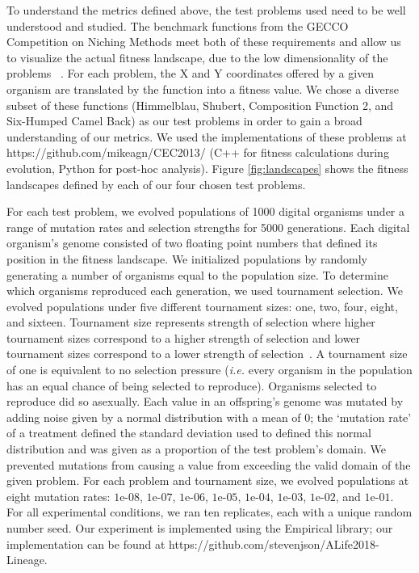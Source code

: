 \documentclass[letterpaper]{article}
\begin{document}
To understand the metrics defined above, the test problems used need to be well understood and studied. The benchmark functions from the GECCO Competition on Niching Methods meet both of these requirements and allow us to visualize the actual fitness landscape, due to the low dimensionality of the problems ~\citep{li_benchmark_2013}. For each problem, the X and Y coordinates offered by a given organism are translated by the function into a fitness value. We chose a diverse subset of these functions (Himmelblau, Shubert, Composition Function 2, and Six-Humped Camel Back) as our test problems in order to gain a broad understanding of our metrics. We used the implementations of these problems at https://github.com/mikeagn/CEC2013/ (C++ for fitness calculations during evolution, Python for post-hoc analysis). Figure \ref{fig:landscapes} shows the fitness landscapes defined by each of our four chosen test problems. 

For each test problem, we evolved populations of 1000 digital organisms under a range of mutation rates and selection strengths for 5000 generations. Each digital organism's genome consisted of two floating point numbers that defined its position in the fitness landscape. 
We initialized populations by randomly generating a number of organisms equal to the population size. 
To determine which organisms reproduced each generation, we used tournament selection. We evolved populations under five different tournament sizes: one, two, four, eight, and sixteen.  Tournament size represents strength of selection where higher tournament sizes correspond to a higher strength of selection and lower tournament sizes correspond to a lower strength of selection~\citep{blickle1995mathematical}.
A tournament size of one is equivalent to no selection pressure (\textit{i.e.} every organism in the population has an equal chance of being selected to reproduce). Organisms selected to reproduce did so asexually. Each value in an offspring's genome was mutated by adding noise given by a normal distribution with a mean of 0; the `mutation rate' of a treatment defined the standard deviation used to defined this normal distribution and was given as a proportion of the test problem's domain. 
We prevented mutations from causing a value from exceeding the valid domain of the given problem. 
For each problem and tournament size, we evolved populations at eight mutation rates: $1\text{e-}08$, $1\text{e-}07$, $1\text{e-}06$, $1\text{e-}05$, $1\text{e-}04$, $1\text{e-}03$, $1\text{e-}02$, and $1\text{e-}01$. 
For all experimental conditions, we ran ten replicates, each with a unique random number seed. 
Our experiment is implemented using the Empirical library; our implementation can be found at https://github.com/stevenjson/ALife2018-Lineage. %
\end{document}
